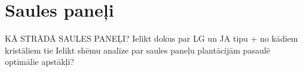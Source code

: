 \section{Saules paneļi}
KĀ STRĀDĀ SAULES PANEĻI?
Ielikt dokus par LG un JA tipu + no kādiem kristāliem tie
Ielikt shēmu
analīze par saules paneļu plantācijām pasaulē
optimālie apstākļi?